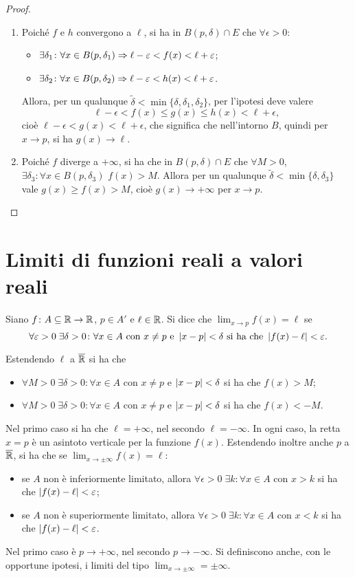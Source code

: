 \begin{proof}
\begin{enumerate}
\item Poiché $f$ e $h$ convergono a $\ell$, si ha in $B(p,\delta)\cap E$ che $\forall\epsilon>0$:
\begin{itemize}
\item $\exists\delta_1\colon\forall x\in B(p,\delta_1)\Rightarrow\ell-\varepsilon<f(x)<\ell+\varepsilon$;
\item $\exists\delta_2\colon\forall x\in B(p,\delta_2)\Rightarrow\ell-\varepsilon<h(x)<\ell+\varepsilon$.
\end{itemize}
Allora, per un qualunque $\tilde{\delta}<\min\{\delta,\delta_1,\delta_2\}$, per l'ipotesi deve valere
\[
\ell-\epsilon<f(x)\leq g(x)\leq h(x)<\ell+\epsilon,
\]
cioè $\ell-\epsilon<g(x)<\ell+\epsilon$, che significa che nell'intorno $B$, quindi per $x\to p$, si ha $g(x)\to\ell$.
\item Poiché $f$ diverge a $+\infty$, si ha che in $B(p,\delta)\cap E$ che $\forall M>0$, $\exists\delta_3\colon\forall x\in B(p,\delta_3)$ $f(x)>M$. Allora per un qualunque $\tilde{\delta}<\min\{\delta,\delta_3\}$ vale $g(x)\geq f(x)>M$, cioè $g(x)\to+\infty$ per $x\to p$.\qedhere
\end{enumerate}
\end{proof}

\section{Limiti di funzioni reali a valori reali}
\begin{definizione}
Siano $f\colon A\subseteq\mathbb{R}\to\mathbb{R}$, $p\in A'$ e $\ell\in\mathbb{R}$. Si dice che $\lim_{x\to p}f(x)=\ell$ se
\[
\forall\varepsilon>0\;\exists\delta>0\colon\forall x\in A\text{ con }x\neq p\text{ e }\left|{x-p}\right|<\delta\text{ si ha che }\left|{f(x)-\ell}\right|<\varepsilon.
\]
\end{definizione}
Estendendo $\ell$ a $\overline{\mathbb{R}}$ si ha che
\begin{itemize}
\item$\forall M>0\;\exists\delta>0\colon\forall x\in A$ con $x\neq p$ e $\left|{x-p}\right|<\delta$ si ha che $f(x)>M$;
\item$\forall M>0\;\exists\delta>0\colon\forall x\in A$ con $x\neq p$ e $\left|{x-p}\right|<\delta$ si ha che $f(x)<-M$.
\end{itemize}
Nel primo caso si ha che $\ell=+\infty$, nel secondo $\ell=-\infty$. In ogni caso, la retta $x=p$ è un asintoto verticale per la funzione $f(x)$.
Estendendo inoltre anche $p$ a $\overline{\mathbb{R}}$, si ha che se $\lim_{x\to\pm\infty}f(x)=\ell$:
\begin{itemize}
\item se $A$ non è inferiormente limitato, allora $\forall\epsilon>0\;\exists k\colon\forall x\in A$ con $x>k$ si ha che $\left|{f(x)-\ell}\right|<\varepsilon$;
\item se $A$ non è superiormente limitato, allora $\forall\epsilon>0\;\exists k\colon\forall x\in A$ con $x<k$ si ha che $\left|{f(x)-\ell}\right|<\varepsilon$.
\end{itemize}
Nel primo caso è $p\to+\infty$, nel secondo $p\to-\infty$.
Si definiscono anche, con le opportune ipotesi, i limiti del tipo $\displaystyle\lim_{x\to\pm\infty}=\pm\infty$.

